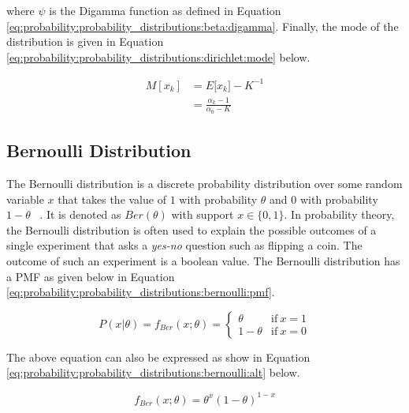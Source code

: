where $\psi$ is the Digamma function as defined in Equation \ref{eq:probability:probability_distributions:beta:digamma}. Finally, the mode of the distribution is given in Equation \ref{eq:probability:probability_distributions:dirichlet:mode} below.

\begin{equation}
      \label{eq:probability:probability_distributions:dirichlet:mode}
      \begin{split}
            M[x_{k}] &= E[{x_{k}] -K^{-1}} \\
            &=  \frac{\alpha_{k} - 1}{\alpha_{0} - K}
      \end{split}
\end{equation}


\subsection{Bernoulli Distribution}
\label{sec:probability:probability_distributions:bernoulli}

The Bernoulli distribution is a discrete probability distribution over some random variable $x$ that takes the value of $1$ with probability $\theta$ and $0$ with probability $1-\theta$ ~\cite{ref:wackerly:2014}. It is denoted as $Ber(\theta)$ with support $x \in \{0, 1\}$. In probability theory, the Bernoulli distribution is often used to explain the possible outcomes of a single experiment that asks a \textit{yes-no} question such as flipping a coin. The outcome of such an experiment is a boolean value. The Bernoulli distribution has a \ac{PMF} as given below in Equation \ref{eq:probability:probability_distributions:bernoulli:pmf}.

\begin{equation}
      \label{eq:probability:probability_distributions:bernoulli:pmf}
      P(x \vert \theta) = f_{Ber}(x; \theta) =
      \begin{cases}
            \theta     & \text{if}\ x=1 \\
            1 - \theta & \text{if}\ x=0
      \end{cases}
\end{equation}

The above equation can also be expressed as show in Equation \ref{eq:probability:probability_distributions:bernoulli:alt} below.

\begin{equation}
      \label{eq:probability:probability_distributions:bernoulli:alt}
      f_{Ber}(x; \theta) = \theta^{x}(1-\theta)^{1-x}
\end{equation}

